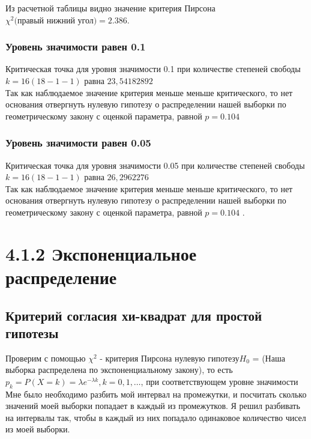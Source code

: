 \documentclass[a4paper,12pt, oneside]{book}
\begin{document}
\newpage
Из расчетной таблицы видно значение критерия Пирсона $ \chi^2 \text{(правый нижний угол)} = 2.386$. 

\subsubsection{Уровень значимости равен 0.1}

Критическая точка для уровня значимости 0.1 при количестве степеней свободы $ k = 16(18 - 1 - 1) $ равна $23,54182892$\\

Так как наблюдаемое значение критерия меньше меньше критического, то нет основания отвергнуть нулевую гипотезу о распределении нашей выборки по геометрическому закону с оценкой параметра, равной $ p = 0.104 $   



\subsubsection{Уровень значимости равен 0.05} 

Критическая точка для уровня значимости 0.05 при количестве степеней свободы $ k = 16(18 - 1 - 1) $ равна $26,2962276$\\

Так как наблюдаемое значение критерия меньше меньше критического, то нет основания отвергнуть нулевую гипотезу о распределении нашей выборки по геометрическому закону с оценкой параметра, равной $ p = 0.104 $ .  





\newpage
\section{4.1.2 Экспоненциальное распределение}


\subsection{Критерий согласия хи-квадрат для простой гипотезы}

Проверим с помощью $ \chi^2 $  - критерия Пирсона нулевую гипотезу$ H_0 $ = (Наша выборка распределена по экспоненциальному закону), то есть $ p_k = P(X = k ) = \lambda e^{-\lambda k}, k = 0,1, \ldots $, при соответствующем уровне значимости\\ 

Мне было необходимо разбить мой интервал на промежутки, и посчитать сколько значений моей выборки попадает в каждый из промежутков. Я решил разбивать на интервалы так, чтобы в каждый из них попадало одинаковое количество чисел из моей выборки.\\
\end{document}
